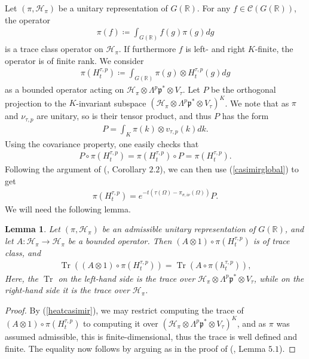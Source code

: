 \documentclass[11pt,reqno]{amsart}
\numberwithin{equation}{section}
\newtheorem{lem}[thm]{Lemma}
\theoremstyle{definition}
\theoremstyle{remark}
\newcommand{\Tr}{\operatorname{Tr}}
\newcommand{\mf}[1]{\mathfrak{#1}}
\newcommand{\R}{\mathbb{R}}
\begin{document}
Let $(\pi,\mathcal{H}_\pi)$ be a unitary representation of $G(\R)$. For any $f\in \mathcal{C}(G(\R))$, the operator
\begin{align*}
    \pi(f) \coloneqq \int_{G(\R)} f(g)\pi(g)dg
\end{align*}
is a trace class operator on $\mathcal{H}_\pi$. If furthermore $f$ is left- and right $K$-finite, the operator is of finite rank.  We consider 
\begin{align*}
    \pi(H_t^{\tau,p}) \coloneqq \int_{G(\R)} \pi(g)\otimes H_t^{\tau,p}(g)dg
\end{align*} 
as a bounded operator acting on $\mathcal{H}_\pi\otimes \Lambda^p\mf{p}^*\otimes V_\tau$. Let $P$ be the orthogonal projection to the $K$-invariant subspace $(\mathcal{H}_\pi\otimes \Lambda^p\mf{p}^*\otimes V_\tau)^K$. We note that as $\pi$ and $\nu_{\tau,p}$ are unitary, so is their tensor product, and thus $P$ has the form
\begin{align*}
    P = \int_K \pi(k)\otimes v_{\tau,p}(k) dk.
\end{align*}
Using the covariance property, one easily checks that
\begin{align*}
    P\circ \pi(H_t^{\tau,p}) = \pi(H_t^{\tau,p})\circ P = \pi(H_t^{\tau,p}).
\end{align*}
Following the argument of (\cite{BM}, Corollary $2.2$), we can then use (\ref{casimirglobal}) to get
\begin{align}\label{heatcasimir}
    \pi(H_t^{\tau,p}) = e^{-t(\tau(\Omega)-\pi_{\sigma,i\nu}(\Omega))} P.
\end{align}
We will need the following lemma.
\begin{lem}\label{tracecommutes}
    Let $(\pi,\mathcal{H}_\pi)$ be an admissible unitary representation of $G(\R)$, and let $A:\mathcal{H}_\pi\to \mathcal{H}_\pi$ be a bounded operator. Then $(A\otimes 1)\circ \pi(H_t^{\tau,p})$ is of trace class, and
    \begin{align*}
        \Tr \left((A\otimes 1)\circ \pi(H_t^{\tau,p})\right) = \Tr\left(A\circ \pi(h_t^{\tau,p})\right),
    \end{align*}
    Here, the $\Tr$ on the left-hand side is the trace over ${\mathcal{H}_\pi\otimes\Lambda^p\mf{p}^*\otimes V_\tau}$, while on the right-hand side it is the trace over $\mathcal{H}_\pi$. 
\end{lem}

\begin{proof}
    By (\ref{heatcasimir}), we may restrict computing the trace of $(A\otimes 1)\circ \pi(H_t^{\tau,p})$ to computing it over $(\mathcal{H}_\pi\otimes \Lambda^p\mf{p}^*\otimes V_\tau)^K$, and as $\pi$ was assumed admissible, this is finite-dimensional, thus the trace is well defined and finite. The equality now follows by arguing as in the proof of (\cite{BM}, Lemma $5.1$).
\end{proof}
\end{document}
